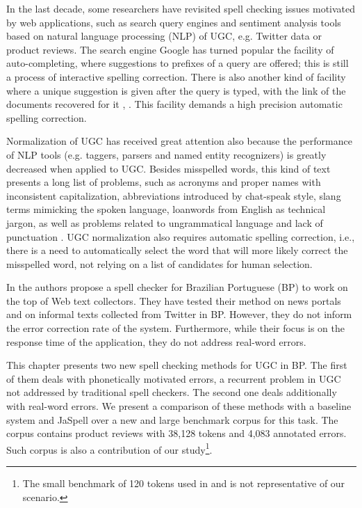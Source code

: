In the last decade, some researchers have revisited spell checking issues motivated by web applications, such as search query engines and sentiment analysis tools based on natural language processing (NLP) of UGC, e.g. Twitter data or product reviews.
The search engine Google has turned popular the facility of auto-completing, where suggestions to prefixes of a query are offered; this is still a process of interactive spelling correction. There is also another kind of facility where a unique suggestion is given after the query is typed, with the link of the documents recovered for it \cite{Duan2011}, \cite{Cucerzan2004}. This facility demands a high precision automatic spelling correction. 

Normalization of UGC has received great attention also because the performance of NLP tools (e.g. taggers, parsers and named entity recognizers) is greatly decreased when applied to UGC. Besides misspelled words, this kind of text presents a long list of problems, such as acronyms and proper names with inconsistent capitalization, abbreviations introduced by chat-speak style, slang terms mimicking the spoken language, loanwords from English as technical jargon, as well as problems related to ungrammatical language and lack of punctuation \cite{Duran2014,DeClercq2013,Han2013,Andrade2012}.
UGC normalization also requires automatic spelling correction, i.e., there is a need to automatically select the word that will more likely correct the misspelled word, not relying on a list of candidates for human selection. 

In \cite{Andrade2012} the authors propose a spell checker for Brazilian Portuguese (BP) to work on the top of Web text collectors. They have tested their method on news portals and on informal texts collected from Twitter in BP. However, they do not inform the error correction rate of the system. Furthermore, while their focus is on the response time of the application, they do not address real-word errors.

This chapter presents two new spell checking methods for UGC in BP. The first of them deals with phonetically motivated errors, a recurrent problem in UGC not addressed by traditional spell checkers. The second one deals additionally with real-word errors.
We present a comparison of these methods with a baseline system and JaSpell over a new and large benchmark corpus for this task. The corpus contains product reviews with 38,128 tokens and 4,083 annotated errors. Such corpus is also a contribution of our study\footnote{The small benchmark of 120 tokens used in \cite{Martins2004} and \cite{Ahmed2009} 
is not representative of our scenario.}. 

